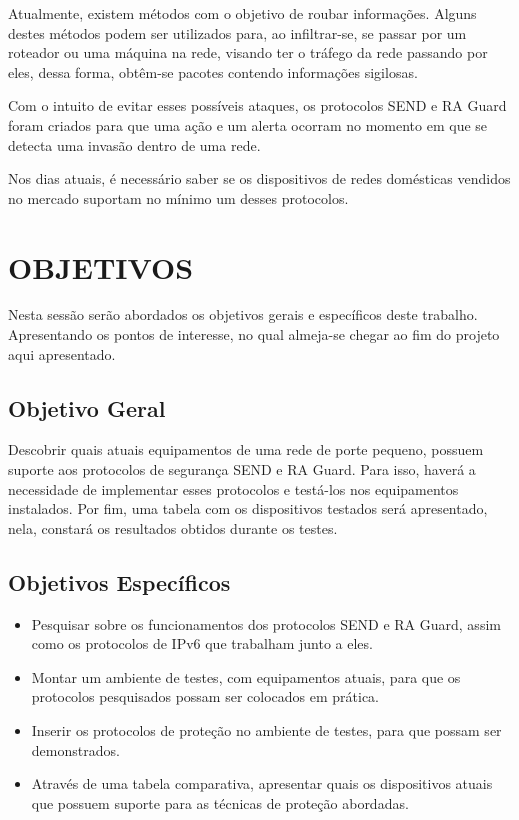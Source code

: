 Atualmente, existem métodos com o objetivo de roubar informações. Alguns destes métodos podem ser utilizados para, ao infiltrar-se, se passar por um roteador ou uma máquina na rede, visando ter o tráfego da rede passando por eles, dessa forma, obtêm-se pacotes contendo informações sigilosas.

Com o intuito de evitar esses possíveis ataques, os protocolos SEND e RA Guard foram criados para que uma ação e um alerta ocorram no momento em que se detecta uma invasão dentro de uma rede.

Nos dias atuais, é necessário saber se os dispositivos de redes domésticas vendidos no mercado suportam no mínimo um desses protocolos. 

\section{OBJETIVOS}\label{sec:objetivos}

Nesta sessão serão abordados os objetivos gerais e específicos deste trabalho. Apresentando os pontos de interesse, no qual almeja-se chegar ao fim do projeto aqui apresentado.

\subsection{Objetivo Geral}

Descobrir quais atuais equipamentos de uma rede de porte pequeno, possuem suporte aos protocolos de segurança SEND e RA Guard. Para isso, haverá a necessidade de implementar esses protocolos e testá-los nos equipamentos instalados. Por fim, uma tabela com os dispositivos testados será apresentado, nela, constará os resultados obtidos durante os testes.

\subsection{Objetivos Específicos}\label{subsec:objetivos_especificos}

\begin{itemize}
\item Pesquisar sobre os funcionamentos dos protocolos SEND e RA Guard, assim como os protocolos de IPv6 que trabalham junto a eles.
\item Montar um ambiente de testes, com equipamentos atuais, para que os protocolos pesquisados possam ser colocados em prática.
\item Inserir os protocolos de proteção no ambiente de testes, para que possam ser demonstrados.
\item Através de uma tabela comparativa, apresentar quais os dispositivos atuais que possuem suporte para as técnicas de proteção abordadas.
\end{itemize}

